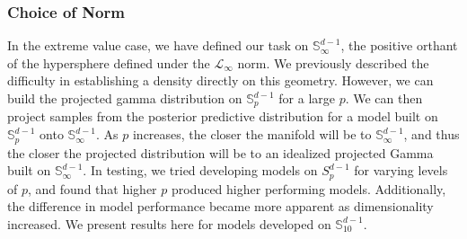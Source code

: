 \subsubsection{Choice of Norm\label{subsubsec:norm}}
In the extreme value case, we have defined our task on ${\mathbb S}_{\infty}^{d-1}$, the positive orthant
  of the hypersphere defined under the $\mathcal{L}_{\infty}$ norm.  We previously described the
  difficulty in establishing a density directly on this geometry.  However, we can build the projected
  gamma distribution on ${\mathbb S}_p^{d-1}$ for a large $p$.  We can then project samples from the
  posterior predictive distribution for a model built on ${\mathbb S}_p^{d-1}$ onto
  ${\mathbb S}_{\infty}^{d-1}$. As $p$ increases, the closer the manifold will be to
  ${\mathbb S}_{\infty}^{d-1}$, and thus the closer the projected distribution will be to an idealized
  projected Gamma built on ${\mathbb S}_{\infty}^{d-1}$.  In testing, we tried developing models on
  $S_p^{d-1}$ for varying levels of $p$, and found that higher $p$ produced higher performing models.
  Additionally, the difference in model performance became more apparent as dimensionality increased.
  We present results here for models developed on ${\mathbb S}_{10}^{d-1}$.

